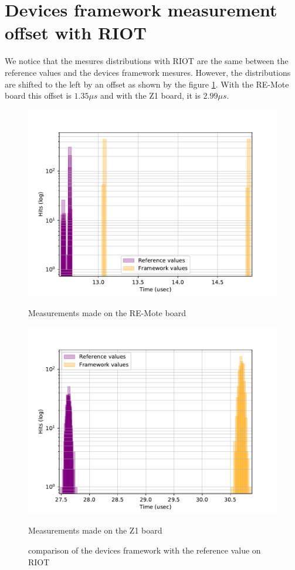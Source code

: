\section{Devices framework measurement offset with RIOT}

We notice that the mesures distributions with RIOT are the same between the reference values and the devices framework mesures.
However, the distributions are shifted to the left by an offset as shown by the figure \ref{fig:devices-comparison-riot}.
With the RE-Mote board this offset is $1.35 \mu s$ and with the Z1 board, it is $2.99 \mu s$.

\begin{figure}[!ht]
  \centering
  \includegraphics[scale=.7]{assets/comparison-devices-framework-riot-remote.pdf}
  \caption*{Measurements made on the RE-Mote board}

  \centering
  \includegraphics[scale=.7]{assets/comparison-devices-framework-riot-z1.pdf}
  \caption*{Measurements made on the Z1 board}
  \caption{comparison of the devices framework with the reference value on RIOT\label{fig:devices-comparison-riot}}
\end{figure}


